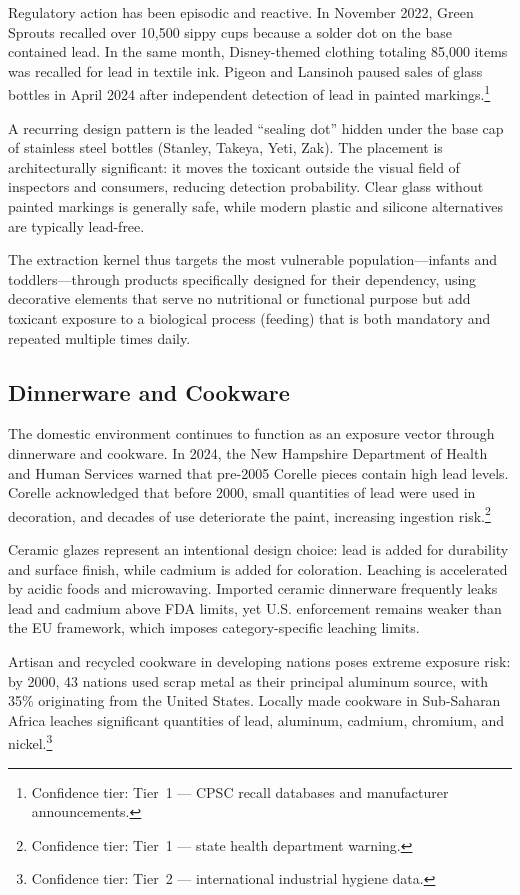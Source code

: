 Regulatory action has been episodic and reactive. In November 2022, Green
Sprouts recalled over 10,500 sippy cups because a solder dot on the base
contained lead. In the same month, Disney-themed clothing totaling 85,000 items
was recalled for lead in textile ink. Pigeon and Lansinoh paused sales of glass
bottles in April 2024 after independent detection of lead in painted
markings.\footnote{Confidence tier: Tier~1 --- CPSC recall databases and
manufacturer announcements.}

A recurring design pattern is the leaded ``sealing dot'' hidden under the
base cap of stainless steel bottles (Stanley, Takeya, Yeti, Zak). The placement
is architecturally significant: it moves the toxicant outside the visual field
of inspectors and consumers, reducing detection probability. Clear glass without
painted markings is generally safe, while modern plastic and silicone
alternatives are typically lead-free.

The extraction kernel thus targets the most vulnerable population---infants and
toddlers---through products specifically designed for their dependency, using
decorative elements that serve no nutritional or functional purpose but add
toxicant exposure to a biological process (feeding) that is both mandatory and
repeated multiple times daily.

\subsection{Dinnerware and Cookware}

The domestic environment continues to function as an exposure vector through
dinnerware and cookware. In 2024, the New Hampshire Department of Health and
Human Services warned that pre-2005 Corelle pieces contain high lead levels.
Corelle acknowledged that before 2000, small quantities of lead were used in
decoration, and decades of use deteriorate the paint, increasing ingestion
risk.\footnote{Confidence tier: Tier~1 --- state health department warning.}

Ceramic glazes represent an intentional design choice: lead is added for
durability and surface finish, while cadmium is added for coloration. Leaching
is accelerated by acidic foods and microwaving. Imported ceramic dinnerware
frequently leaks lead and cadmium above FDA limits, yet U.S. enforcement remains
weaker than the EU framework, which imposes category-specific leaching limits.

Artisan and recycled cookware in developing nations poses extreme exposure
risk: by 2000, 43 nations used scrap metal as their principal aluminum source,
with 35\% originating from the United States. Locally made cookware in
Sub-Saharan Africa leaches significant quantities of lead, aluminum, cadmium,
chromium, and nickel.\footnote{Confidence tier: Tier~2 --- international industrial
hygiene data.}

